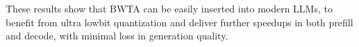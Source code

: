 \begin{revresponse}[]
These results show that BWTA can be easily inserted into modern LLMs, to benefit from ultra lowbit quantization and deliver further speedups in both prefill and decode, with minimal loss in generation quality. 

\end{revresponse}

\clearpage
\printbibliography[heading=bibintoc, heading=bibliography, title={References}, section=\therefsection]